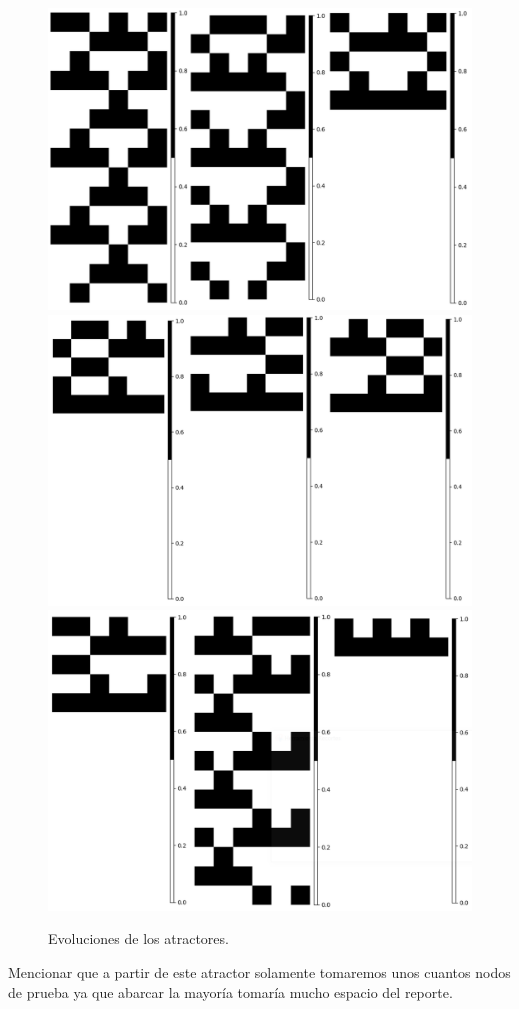 \documentclass[11pt]{article}
\begin{document}
			\begin{figure}[H]
			\centering
			\includegraphics[scale=0.3]{resources/Atractores54/atractor_54_size_6_res.png}
			\includegraphics[scale=0.3]{resources/Atractores54/atractor_54_size_6_res1.png}
			\includegraphics[scale=0.3]{resources/Atractores54/atractor_54_size_6_res2.png}
			\caption{Evoluciones de los atractores.}\label{fig:picture}
			\end{figure}
			Mencionar que a partir de este atractor solamente tomaremos unos cuantos nodos de prueba ya que abarcar la mayoría tomaría mucho espacio del reporte.
				
\end{document}
